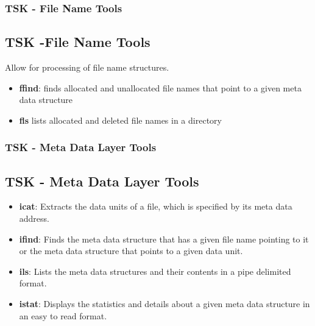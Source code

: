 \documentclass{beamer}
\begin{document}
\begin{frame}
	\frametitle{TSK - File Name Tools}
	\subsection*{TSK -File Name Tools}
	Allow for processing of file name structures.
	\begin{itemize}
		\item \textbf{ffind}: finds allocated and unallocated file names that point to a given meta data structure
		\item \textbf{fls} lists allocated and deleted file names in a directory
	\end{itemize}		
\end{frame}

\begin{frame}
	\frametitle{TSK - Meta Data Layer Tools}
	\subsection*{TSK - Meta Data Layer Tools}
	\begin{itemize}
		\item \textbf{icat}: Extracts the data units of a file, which is specified by its meta data address.
		\item \textbf{ifind}: Finds the meta data structure that has a given file name pointing to it or the meta data structure that points to a given data unit.
		\item \textbf{ils}: Lists the meta data structures and their contents in a pipe delimited format.
		\item \textbf{istat}: Displays the statistics and details about a given meta data structure in an easy to read format.
	\end{itemize}
\end{frame}
\end{document}
